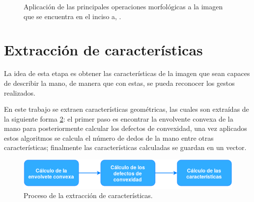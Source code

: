 \begin{figure}[h!]
\caption{Aplicación de las principales operaciones morfológicas a la imagen que se encuentra en el inciso a, \citep{Smith1999}.\quad }\label{fig:OM}
\end{figure} 






\section{Extracción de características}\label{sec:Convexhull} 

La idea de esta etapa es obtener las características de la imagen que sean capaces de describir la mano, de manera que con estas, se pueda reconocer los gestos realizados.
   
En este trabajo se extraen características geométricas, las cuales son extraídas de la siguiente forma \ref{fig:DiagramaExtraccionCaracteristicas}: el primer paso es encontrar la envolvente convexa de la mano para posteriormente calcular los defectos de convexidad, una vez aplicados estos algoritmos se calcula el número de dedos de la mano entre otras características; finalmente las características calculadas  se guardan en un vector.  

\begin{figure}[h!]
\begin{center}
\includegraphics[scale=.7]{./Figures/DExtraccion.png}
\end{center}
\caption{Proceso de la extracción de características.}
\label{fig:DiagramaExtraccionCaracteristicas}
\end{figure} 

